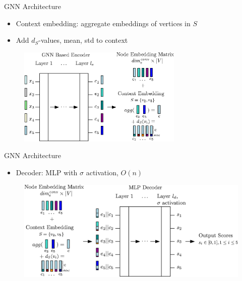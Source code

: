 \documentclass{beamer}
\begin{document}
\begin{frame}{GNN Architecture}
    \begin{itemize}
        \item Context embedding: aggregate embeddings of vertices in $S$
        \item Add $d_S$-values, mean, std to context
    \end{itemize}
    \begin{figure}
        \centering
        \includegraphics[width=0.7\textwidth]{graphics/architecture-3.eps}
    \end{figure}
\end{frame}

\begin{frame}{GNN Architecture}
    \begin{itemize}
        \item Decoder: MLP with $\sigma$ activation, $O(n)$
    \end{itemize}
    \begin{figure}
        \centering
        \includegraphics[width=\textwidth]{graphics/architecture-4.eps}
    \end{figure}
\end{frame}
\end{document}
